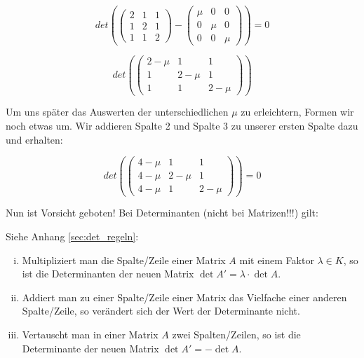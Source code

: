 \begin{uebsp}
\begin{Answer}
\begin{equation*}
\mathit{det}(\left(\begin{matrix}2&1&1\\1&2&1\\1&1&2\end{matrix}\right)-\left(\begin{matrix}\mu
&0&0\\0&\mu &0\\0&0&\mu \end{matrix}\right))=0
\end{equation*}






\begin{equation*}
\mathit{det}(\left(\begin{matrix}2-\mu &1&1\\1&2-\mu &1\\1&1&2-\mu
\end{matrix}\right))
\end{equation*}


{
Um uns sp\"ater das Auswerten der unterschiedlichen  $\mu $ zu
erleichtern, Formen wir noch etwas um. Wir addieren Spalte 2 und Spalte
3 zu unserer ersten Spalte dazu und erhalten:}

\begin{equation*}
\mathit{det}(\left(\begin{matrix}4-\mu &1&1\\4-\mu &2-\mu &1\\4-\mu
&1&2-\mu \end{matrix}\right))=0
\end{equation*}


{
Nun ist Vorsicht geboten! Bei Determinanten (nicht bei Matrizen!!!)
gilt:}


\begin{uebsp_theory}
Siehe Anhang \ref{sec:det_regeln}:
\begin{enumerate}[i)]
    \item \label{itm:det_regel_multi} Multipliziert man die Spalte/Zeile einer Matrix $A$ mit einem Faktor $\lambda\in K$, so ist die Determinanten der neuen Matrix $\det A'=\lambda\cdot \det A$.
    \item \label{itm:det_regel_addi}Addiert man zu einer Spalte/Zeile einer Matrix das Vielfache einer anderen Spalte/Zeile, so verändert sich der Wert der Determinante nicht.
    \item Vertauscht man in einer Matrix $A$ zwei Spalten/Zeilen, so ist die Determinante der neuen Matrix $\det A'=-\det A$.
\end{enumerate}
\end{uebsp_theory}


\end{Answer}
\end{uebsp}
